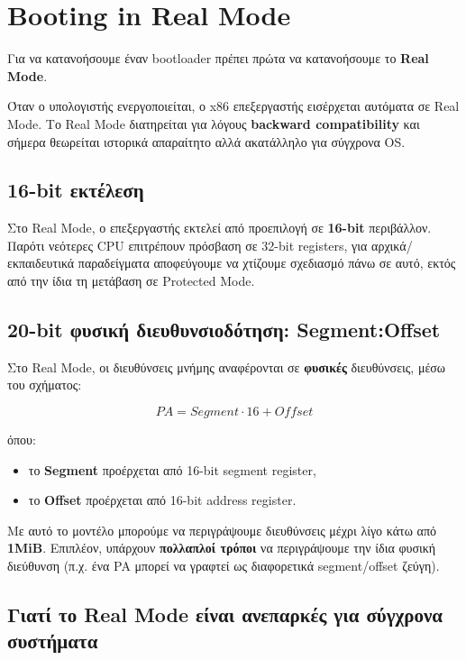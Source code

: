 \documentclass[18pt]{extarticle}
\begin{document}

\section{Booting in Real Mode}

Για να κατανοήσουμε έναν bootloader πρέπει πρώτα να κατανοήσουμε το \textbf{Real Mode}.

Όταν ο υπολογιστής ενεργοποιείται, ο x86 επεξεργαστής εισέρχεται αυτόματα σε Real Mode. Το Real Mode
διατηρείται για λόγους \textbf{backward compatibility} και σήμερα θεωρείται ιστορικά απαραίτητο αλλά
ακατάλληλο για σύγχρονα OS.

\subsection{16-bit εκτέλεση}

Στο Real Mode, ο επεξεργαστής εκτελεί από προεπιλογή σε \textbf{16-bit} περιβάλλον. Παρότι νεότερες
CPU επιτρέπουν πρόσβαση σε 32-bit registers, για αρχικά/εκπαιδευτικά παραδείγματα αποφεύγουμε να
χτίζουμε σχεδιασμό πάνω σε αυτό, εκτός από την ίδια τη μετάβαση σε Protected Mode.

\subsection{20-bit φυσική διευθυνσιοδότηση: Segment:Offset}

Στο Real Mode, οι διευθύνσεις μνήμης αναφέρονται σε \textbf{φυσικές} διευθύνσεις, μέσω του σχήματος:

\[
PA = Segment \cdot 16 + Offset
\]

όπου:
\begin{itemize}
    \item το \textbf{Segment} προέρχεται από 16-bit segment register,
    \item το \textbf{Offset} προέρχεται από 16-bit address register.
\end{itemize}

Με αυτό το μοντέλο μπορούμε να περιγράψουμε διευθύνσεις μέχρι λίγο κάτω από \textbf{1MiB}.
Επιπλέον, υπάρχουν \textbf{πολλαπλοί τρόποι} να περιγράψουμε την ίδια φυσική διεύθυνση (π.χ. ένα PA
μπορεί να γραφτεί ως διαφορετικά segment/offset ζεύγη).

\subsection{Γιατί το Real Mode είναι ανεπαρκές για σύγχρονα συστήματα}
\end{document}
